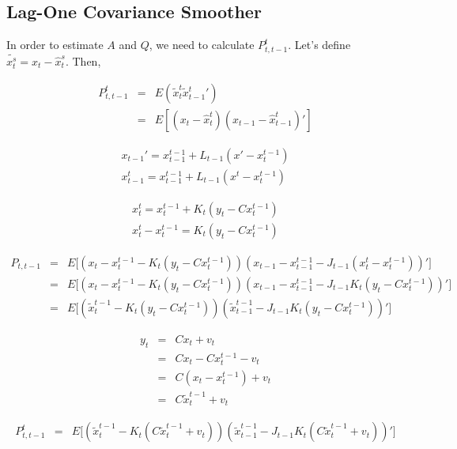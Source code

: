 \documentclass[12pt]{report}
\begin{document}
\subsection{Lag-One Covariance Smoother}

In order to estimate $A$ and $Q$, we need to calculate $P_{t,t-1}^t$. Let's
define $\tilde{x_t^s} = x_t - \hat{x}_t^s$. Then,

\begin{eqnarray*}
P_{t,t-1}^t &=& E ( \tilde{x}_t^t \tilde{x}{_{t-1}^t}'  ) \\
&=& E[ (x_t - \hat{x}_t^t) (x_{t-1} - \hat{x}_{t-1}^t)' ]
\end{eqnarray*}

\begin{eqnarray*}
x_{t-1}' = x_{t-1}^{t-1} + L_{t-1} (x' - x_t ^ {t-1}) \\
x_{t-1}^t = x_{t-1}^{t-1} + L_{t-1} (x^t - x_t ^ {t-1}) 
\end{eqnarray*}

\begin{eqnarray*}
x_t^t = x_t^{t-1} + K_t(y_t - Cx_t^{t-1}) \\
x_t^t - x_t^{t-1} = K_t(y_t - Cx_t^{t-1})
\end{eqnarray*}

\begin{eqnarray*}
P_{t,t-1} &=& E\bigg[
  (x_t - x_t^{t-1} - K_t(y_t - Cx_t^{t-1}) )
  (x_{t-1} - x_{t-1}^{t-1} - J_{t-1}(x_t^t - x_t^{t-1}))'
  \bigg]\\
&=& E\bigg[
  (x_t - x_t^{t-1} - K_t(y_t - Cx_t^{t-1}))
  (x_{t-1} - x_{t-1}^{t-1} - J_{t-1}K_t(y_t - Cx_t^{t-1}))'
  \bigg]\\
&=& E\bigg[
  (\tilde{x}_t^{t-1} - K_t(y_t - Cx_t^{t-1}))
  (\tilde{x}_{t-1}^{t-1} - J_{t-1}K_t(y_t - Cx_t^{t-1}))'
  \bigg]
\end{eqnarray*}

\begin{eqnarray*}
y_t &=& Cx_t + v_t \\
&=& Cx_t - Cx_t^{t-1} - v_t \\
&=& C(x_t - x_t^{t-1})+v_t \\
&=& C\tilde{x}_t^{t-1}+v_t
\end{eqnarray*}

\begin{eqnarray*}
P_{t,t-1}^t &=& E\bigg[
  (\tilde{x}_t^{t-1} - K_t( C\tilde{x}_t^{t-1}+v_t ))
  (\tilde{x}_{t-1}^{t-1} - J_{t-1}K_t( C\tilde{x}_t^{t-1}+v_t ))' 
  \bigg]
\end{eqnarray*}
\end{document}
